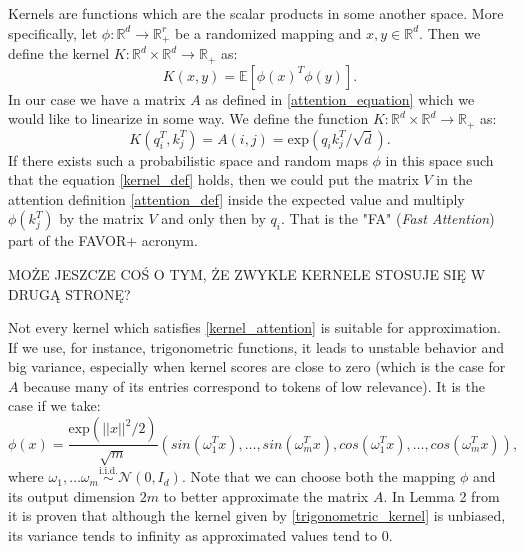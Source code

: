 \documentclass[magisterska,en]{pracamgr}
\begin{document}
Kernels are functions which are the scalar products in some another space. More specifically, let $\phi : \mathbb{R}^d \rightarrow \mathbb{R}^r_+$ be a randomized mapping and $x, y \in \mathbb{R}^d$. Then we define the kernel $K:\mathbb{R}^d \times \mathbb{R}^d \rightarrow \mathbb{R}_+$ as:
\begin{equation}
    K(x,y) = \mathbb{E} \left[\phi(x)^T\phi(y)\right].
\end{equation}\label{kernel_def}
In our case we have a matrix $A$ as defined in \ref{attention_equation} which we would like to linearize in some way. We define the function $K:\mathbb{R}^d \times \mathbb{R}^d \rightarrow \mathbb{R}_+$ as:
\begin{equation}
    K(q_i^T, k_j^T) = A(i,j) = \textrm{exp}\left(q_i k_j^T/\sqrt{d}\right).
\end{equation}\label{kernel_attention}
If there exists such a probabilistic space and random maps $\phi$ in this space such that the equation \ref{kernel_def} holds, then we could put the matrix $V$ in the attention definition \ref{attention_def} inside the expected value and multiply $\phi(k_j^T)$ by the matrix $V$ and only then by $q_i$. That is the "FA" (\textit{Fast Attention}) part of the FAVOR+ acronym.


MOŻE JESZCZE COŚ O TYM, ŻE ZWYKLE KERNELE STOSUJE SIĘ W DRUGĄ STRONĘ?

Not every kernel which satisfies \ref{kernel_attention} is suitable for approximation. If we use, for instance, trigonometric functions, it leads to unstable behavior and big variance, especially when kernel scores are close to zero (which is the case for $A$ because many of its entries correspond to tokens of low relevance). It is the case if we take:
\begin{equation}
    \phi(x) = \frac{\textrm{exp}(||x||^2/2)}{\sqrt{m}}\left(sin(\omega _1^T x), \ldots, sin(\omega _m^T x), cos(\omega _1^T x), \ldots, cos(\omega _m^T x)\right),
\end{equation}\label{trigonometric_kernel}
where $\omega _1, \ldots \omega _m \stackrel{\textrm{i.i.d.}}{\sim} \mathcal{N}(0, I_d)$. Note that we can choose both the mapping $\phi$ and its output dimension $2m$ to better approximate the matrix $A$. In Lemma 2 from \cite{DBLP:conf/iclr/ChoromanskiLDSG21} it is proven that although the kernel given by \ref{trigonometric_kernel} is unbiased, its variance tends to infinity as approximated values tend to 0.
\end{document}
